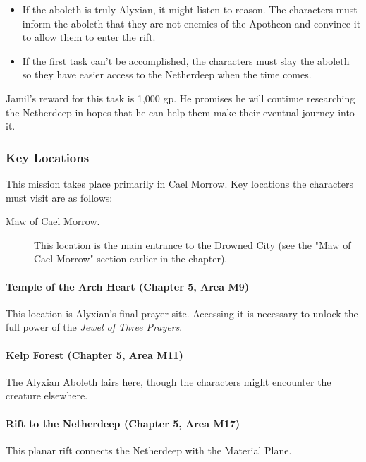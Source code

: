 \documentclass[letterpaper, 11pt, bg=full, twocolumn]{dndbook}
\begin{document}
\begin{itemize}
\item If the aboleth is truly Alyxian, it might listen to reason. The characters must inform the aboleth that they are not enemies of the Apotheon and convince it to allow them to enter the rift.
\item If the first task can't be accomplished, the characters must slay the aboleth so they have easier access to the Netherdeep when the time comes.
\end{itemize}

Jamil's reward for this task is 1,000 gp. He promises he will continue researching the Netherdeep in hopes that he can help them make their eventual journey into it.

\subsubsection{Key Locations}

This mission takes place primarily in Cael Morrow. Key locations the characters must visit are as follows:

\begin{description}
\item[Maw of Cael Morrow.] This location is the main entrance to the Drowned City (see the "Maw of Cael Morrow" section earlier in the chapter).
\end{description}

\paragraph{Temple of the Arch Heart (Chapter 5, Area M9)}

This location is Alyxian's final prayer site. Accessing it is necessary to unlock the full power of the \textit{Jewel of Three Prayers}.

\paragraph{Kelp Forest (Chapter 5, Area M11)}

The Alyxian Aboleth lairs here, though the characters might encounter the creature elsewhere.

\paragraph{Rift to the Netherdeep (Chapter 5, Area M17)}

This planar rift connects the Netherdeep with the Material Plane.
\end{document}
